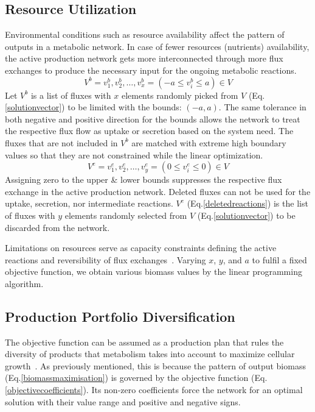 \subsection*{Resource Utilization}
%
Environmental conditions such as resource availability affect the pattern of outputs in a metabolic network. In case of fewer resources (nutrients) availability, the active production network gets more interconnected through more flux exchanges to produce the necessary input for the ongoing metabolic reactions.~\cite{PRICE2004,MAHADEVAN2003,Reed01092004,BURGARD2001}
\begin{equation} %
	V^{b}={v^{b}_{1}, v^{b}_{2},\dots, v^{b}_{x}}= (-a\le v^{b}_{i}\le a)\in V
	\label{constrainedfluxlist}
\end{equation}
Let $V^{b}$ is a list of fluxes with $x$ elements randomly picked from $V$ (Eq.\eqref{solutionvector}) to be limited with the bounds: $(-a, a)$. The same tolerance in both negative and positive direction for the bounds allows the network to treat the respective flux flow as uptake or secretion based on the system need. The fluxes that are not included in $V^{b}$ are matched with extreme high boundary values so that they are not constrained while the linear optimization.
\begin{equation} %
	V^{e}={v^{e}_{1}, v^{e}_{2},\dots, v^{e}_{y}}= (0\le v^{e}_{i}\le 0)\in V
	\label{deletedreactions}
\end{equation}
Assigning zero to the upper \& lower bounds suppresses the respective flux exchange in the active production network. Deleted fluxes can not be used for the uptake, secretion, nor intermediate reactions. $V^{e}$ (Eq.\eqref{deletedreactions}) is the list of fluxes with $y$ elements randomly selected from $V$ (Eq.\eqref{solutionvector}) to be discarded from the network.

Limitations on resources serve as capacity constraints defining the active reactions and reversibility of flux exchanges~\cite{Edwards2001}. Varying $x$, $y$, and $a$ to fulfil a fixed objective function, we obtain various biomass values by the linear programming algorithm.

\subsection*{Production Portfolio Diversification}
%
The objective function can be assumed as a production plan that rules the diversity of products that metabolism takes into account to maximize cellular growth~\cite{Edwards2001}. As previously mentioned, this is because the pattern of output biomass (Eq.\eqref{biomassmaximisation}) is governed by the objective function (Eq.\eqref{objectivecoefficients}). Its non-zero coefficients force the network for an optimal solution with their value range and positive and negative signs.    

